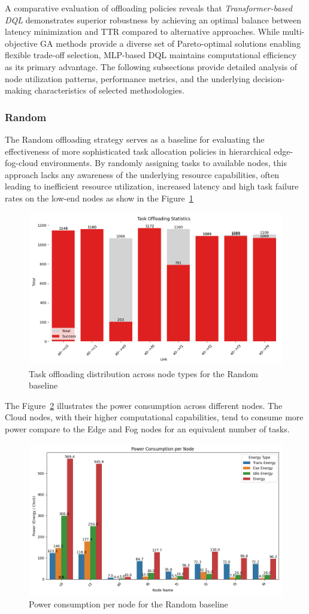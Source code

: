 \documentclass[preprint,3p,authoryear]{elsarticle}
\begin{document}
A comparative evaluation of offloading policies reveals that \emph{Transformer-based DQL} demonstrates superior robustness by achieving an optimal balance between latency minimization and TTR compared to alternative approaches. While multi-objective GA methods provide a diverse set of Pareto-optimal solutions enabling flexible trade-off selection, MLP-based DQL maintains computational efficiency as its primary advantage. The following subsections provide detailed analysis of node utilization patterns, performance metrics, and the underlying decision-making characteristics of selected methodologies.

\subsubsection{Random}
\label{subsec:random}

The Random offloading strategy serves as a baseline for evaluating the effectiveness of more sophisticated task allocation policies in hierarchical edge-fog-cloud environments. By randomly assigning tasks to available nodes, this approach lacks any awareness of the underlying resource capabilities, often leading to inefficient resource utilization, increased latency and high task failure rates on the low-end nodes as show in the Figure~\ref{fig:random-task-offloading-stats}

\begin{figure}[H]
    \centering
    \includegraphics[width=0.5\linewidth]{figs/Random/task_offloading_statistics.png}
    \caption{Task offloading distribution across node types for the Random baseline}
    \label{fig:random-task-offloading-stats}
\end{figure}

The Figure~\ref{fig:random-power-consumption} illustrates the power consumption across different nodes. The Cloud nodes, with their higher computational capabilities, tend to consume more power compare to the Edge and Fog nodes for an equivalent number of tasks. 

\begin{figure}[H]
    \centering
    \includegraphics[width=0.5\linewidth]{figs/Random/power_consumption_per_node.png}
    \caption{Power consumption per node for the Random baseline}
    \label{fig:random-power-consumption}
\end{figure}
\end{document}
